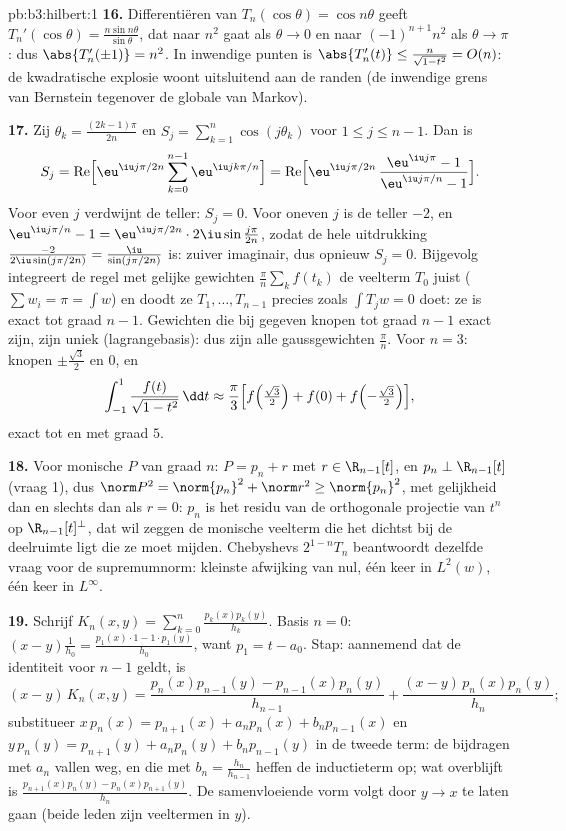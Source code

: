 \begin{solution}{pb:b3:hilbert:1}
\textbf{16.} Differentiëren van $T_n(\cos\theta) = \cos n\theta$
geeft $T_n'(\cos\theta) = \frac{n\sin n\theta} {\sin\theta}$, dat
naar $n^2$ gaat als $\theta \to 0$ en naar $(-1)^{n+1}n^2$ als
$\theta \to \pi$: dus $\abs{T_n'(\pm1)} = n^2$. In inwendige
punten is $\abs{T_n'(t)} \leq \frac{n}{\sqrt{1 - t^2}} = O(n)$:
de kwadratische explosie woont uitsluitend aan de randen (de
inwendige grens van Bernstein tegenover de globale van Markov).

\textbf{17.} Zij $\theta_k = \frac{(2k-1)\pi}{2n}$ en $S_j =
\sum_{k=1}^n\cos(j\theta_k)$ voor $1 \leq j \leq n-1$. Dan is
\[
S_j = \operatorname{Re}\Bigl[\eu^{\iu j\pi/2n}
\sum_{k=0}^{n-1}\eu^{\iu jk\pi/n}\Bigr]
= \operatorname{Re}\Bigl[\eu^{\iu j\pi/2n}\,
\frac{\eu^{\iu j\pi} - 1}{\eu^{\iu j\pi/n} - 1}\Bigr] .
\]
Voor even $j$ verdwijnt de teller: $S_j = 0$. Voor oneven $j$ is
de teller $-2$, en $\eu^{\iu j\pi/n} - 1 = \eu^{\iu
j\pi/2n}\cdot2\iu\sin\frac{j\pi}{2n}$, zodat de hele uitdrukking
$\frac{-2}{2\iu\sin(j\pi/2n)} = \frac{\iu}{\sin(j\pi/2n)}$ is:
zuiver imaginair, dus opnieuw $S_j = 0$. Bijgevolg integreert de
regel met gelijke gewichten $\frac\pi n\sum_kf(t_k)$ de veelterm
$T_0$ juist ($\sum w_i = \pi = \int w$) en doodt ze $T_1, \dots,
T_{n-1}$ precies zoals $\int T_jw = 0$ doet: ze is exact tot
graad $n - 1$. Gewichten die bij gegeven knopen tot graad $n-1$
exact zijn, zijn uniek (lagrangebasis): dus zijn alle
gaussgewichten $\frac\pi n$. Voor $n = 3$: knopen
$\pm\frac{\sqrt3}2$ en $0$, en
\[
\int_{-1}^1\frac{f(t)}{\sqrt{1 - t^2}}\,\dd t \approx
\frac\pi3\Bigl[f\Bigl(\tfrac{\sqrt3}2\Bigr) + f(0) +
f\Bigl(-\tfrac{\sqrt3}2\Bigr)\Bigr],
\]
exact tot en met graad $5$.

\textbf{18.} Voor monische $P$ van graad $n$: $P = p_n + r$ met
$r \in \R_{n-1}[t]$, en $p_n \perp \R_{n-1}[t]$ (vraag 1), dus
$\norm P^2 = \norm{p_n}^2 + \norm r^2 \geq \norm{p_n}^2$, met
gelijkheid dan en slechts dan als $r = 0$: $p_n$ is het residu
van de orthogonale projectie van $t^n$ op $\R_{n-1}[t]^\perp$,
dat wil zeggen de monische veelterm die het dichtst bij de
deelruimte ligt die ze moet mijden. Chebyshevs $2^{1-n}T_n$
beantwoordt dezelfde vraag voor de supremumnorm: kleinste afwijking
van nul, één keer in $L^2(w)$, één keer in $L^\infty$.

\textbf{19.} Schrijf $K_n(x, y) =
\sum_{k=0}^n\frac{p_k(x)p_k(y)}{h_k}$. Basis $n = 0$: $(x -
y)\frac1{h_0} = \frac{p_1(x)\cdot1 - 1\cdot p_1(y)}{h_0}$, want
$p_1 = t - a_0$. Stap: aannemend dat de identiteit voor $n - 1$
geldt, is
\[
(x - y)\,K_n(x,y) = \frac{p_n(x)p_{n-1}(y) -
p_{n-1}(x)p_n(y)}{h_{n-1}} +
\frac{(x - y)\,p_n(x)p_n(y)}{h_n} ;
\]
substitueer $x\,p_n(x) = p_{n+1}(x) + a_np_n(x) + b_np_{n-1}(x)$
en $y\,p_n(y) = p_{n+1}(y) + a_np_n(y) + b_np_{n-1}(y)$ in de
tweede term: de bijdragen met $a_n$ vallen weg, en die met $b_n =
\frac{h_n}{h_{n-1}}$ heffen de inductieterm op; wat overblijft is
$\frac{p_{n+1}(x)p_n(y) - p_n(x)p_{n+1}(y)}{h_n}$. De
samenvloeiende vorm volgt door $y \to x$ te laten gaan (beide
leden zijn veeltermen in $y$).


\end{solution}
